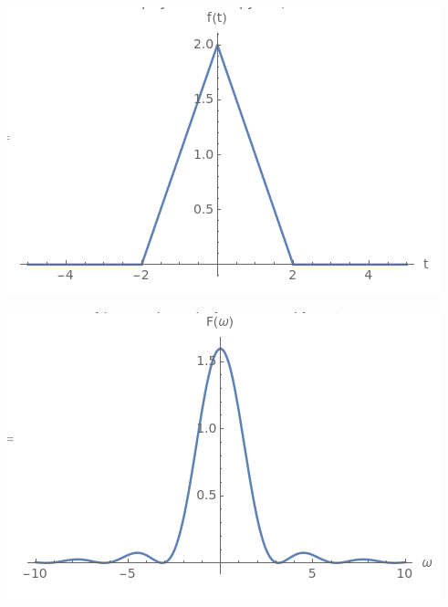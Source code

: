 \documentclass[a4paper,12pt]{article}
\begin{document}
\begin{center}
\begin{minipage}{0.48\textwidth}
  \centering
  \includegraphics[width=\linewidth]{images/2f22.png}
\end{minipage}
\hfill
\begin{minipage}{0.48\textwidth}
  \centering
  \includegraphics[width=\linewidth]{images/2F22.png}
\end{minipage}
\end{center}
\end{document}
